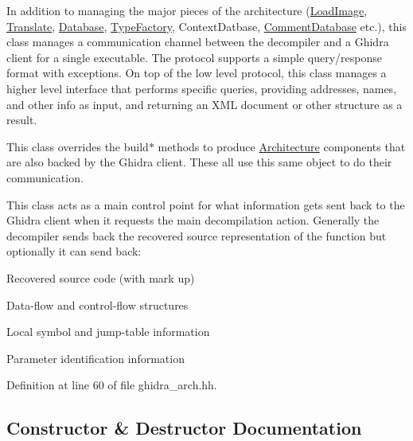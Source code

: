 In addition to managing the major pieces of the architecture (\mbox{\hyperlink{class_load_image}{Load\+Image}}, \mbox{\hyperlink{class_translate}{Translate}}, \mbox{\hyperlink{class_database}{Database}}, \mbox{\hyperlink{class_type_factory}{Type\+Factory}}, Context\+Datbase, \mbox{\hyperlink{class_comment_database}{Comment\+Database}} etc.), this class manages a communication channel between the decompiler and a Ghidra client for a single executable. The protocol supports a simple query/response format with exceptions. On top of the low level protocol, this class manages a higher level interface that performs specific queries, providing addresses, names, and other info as input, and returning an X\+ML document or other structure as a result.

This class overrides the build$\ast$ methods to produce \mbox{\hyperlink{class_architecture}{Architecture}} components that are also backed by the Ghidra client. These all use this same object to do their communication.

This class acts as a main control point for what information gets sent back to the Ghidra client when it requests the main decompilation action. Generally the decompiler sends back the recovered source representation of the function but optionally it can send back\+:
\begin{DoxyItemize}
\item Recovered source code (with mark up)
\item Data-\/flow and control-\/flow structures
\item Local symbol and jump-\/table information
\item Parameter identification information 
\end{DoxyItemize}

Definition at line 60 of file ghidra\+\_\+arch.\+hh.



\subsection{Constructor \& Destructor Documentation}
\mbox{\label{class_architecture_ghidra_ac2dd133afc911293c1c6d059661fbf0f}} 
